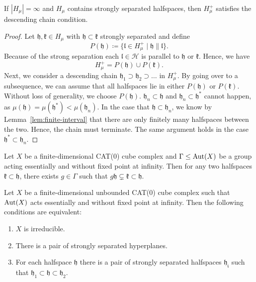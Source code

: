 \begin{lemma}[{\cite[Lemma~4.18]{MR3509968}}]
  \label{lem:4.18}
  If \(|H_\mu| = \infty\) and \(H_\mu\) contains strongly separated halfspaces, then \(H_\mu^+\) satisfies the descending chain condition.
\end{lemma}

\begin{proof}
  Let \(\mathfrak{h, k} \in H_\mu\) with \(\mathfrak{h} \subset \mathfrak{k}\) strongly separated and define
  \[
    P(\mathfrak{h}) \coloneqq \{\mathfrak{l} \in H_\mu^+ \mid \mathfrak{h} \parallel \mathfrak{l}\}.
  \]
  Because of the strong separation each \(\mathfrak{l} \in \mathcal{H}\) is parallel to \(\mathfrak{h}\) or \(\mathfrak{k}\). Hence, we have
  \[
    H_\mu^+ = P(\mathfrak{h}) \cup P(\mathfrak{k}).
  \]
  Next, we consider a descending chain \(\mathfrak{h_1} \supset \mathfrak{h_2} \supset \dots\) in \(H_\mu^+\). By going over to a subsequence, we can assume that all halfspaces lie in either \(P(\mathfrak{h})\) or \(P(\mathfrak{k})\). Without loss of generality, we choose \(P(\mathfrak{h})\). \(\mathfrak{h}_n \subset \mathfrak{h}\) and \(\mathfrak{h}_n \subset \mathfrak{h}^\ast\) cannot happen, as \(\mu(\mathfrak{h}) = \mu(\mathfrak{h}^\ast) < \mu(\mathfrak{h}_n)\). In the case that \(\mathfrak{h} \subset \mathfrak{h}_n\), we know by Lemma~\ref{lem:finite-interval} that there are only finitely many halfspaces between the two. Hence, the chain must terminate. The same argument holds in the case \(\mathfrak{h}^\ast \subset \mathfrak{h}_n\).
\end{proof}

\begin{lemma}
  \label{lem:cs-dsl}
  Let \(X\) be a finite-dimensional CAT(0) cube complex and \(\Gamma \leq \operatorname{Aut}(X)\) be a group acting essentially and without fixed point at infinity. Then for any two halfspaces \(\mathfrak{k} \subset \mathfrak{h}\), there exists \(g \in \Gamma\) such that \(g \mathfrak{h} \subsetneq \mathfrak{k} \subset \mathfrak{h}\).
\end{lemma}

\begin{prop}
  \label{prop:cs-5.1}
  Let \(X\) be a finite-dimensional unbounded CAT(0) cube complex such that \(\operatorname{Aut}(X)\) acts essentially and without fixed point at infinity. Then the following conditions are equivalent:
  \begin{enumerate}
  \item \(X\) is irreducible.
  \item There is a pair of strongly separated hyperplanes.
  \item For each halfspace \(\mathfrak{h}\) there is a pair of strongly separated halfspaces \(\mathfrak{h_i}\) such that \(\mathfrak{h}_1 \subset \mathfrak{h} \subset \mathfrak{h}_2\).
  \end{enumerate}
\end{prop}

